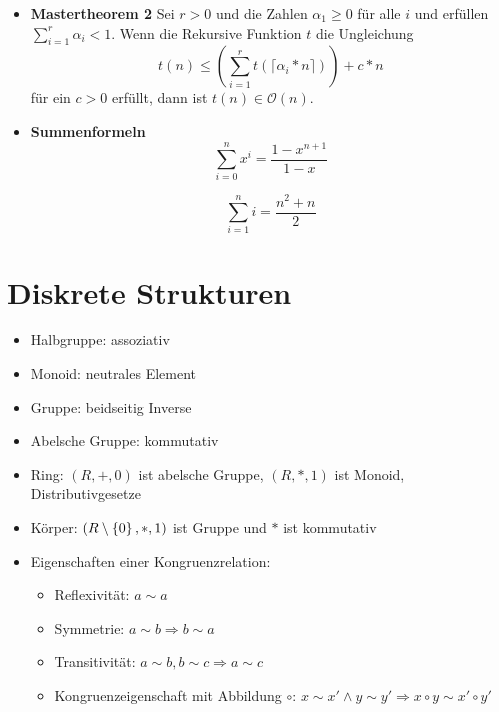\documentclass[landscape, 8pt, a4paper]{extarticle}
\newcommand{\simpleset}[1]{\ensuremath\left\{ #1 \right\}}
\renewcommand{\O}{\mathcal O}
\begin{document}
\begin{multicols}{3}
\begin{itemize}
		\item \textbf{Mastertheorem 2} Sei $r>0$ und die Zahlen $\alpha_1\geq 0$ für alle $i$ und erfüllen $\sum_{i=1}^r\alpha_i<1$.
		Wenn die Rekursive Funktion $t$ die Ungleichung
		\begin{equation*}
			t(n)\leq \left( \sum_{i=1}^r t(\lceil \alpha_i*n\rceil) \right)+c*n
		\end{equation*}
		für ein $c>0$ erfüllt, dann ist $t(n)\in\O(n)$.

		\item \textbf{Summenformeln}
		\begin{equation*}
			\sum_{i=0}^n x^i = \frac{1-x^{n+1}}{1-x}
		\end{equation*}

		\begin{equation*}
			\sum_{i=1}^n i=\frac{n^2+n}{2}
		\end{equation*}
	\end{itemize}



	\section{Diskrete Strukturen}
	\begin{itemize}
		\item Halbgruppe: assoziativ
		\item Monoid: neutrales Element
		\item Gruppe: beidseitig Inverse
		\item Abelsche Gruppe: kommutativ
		\item Ring: $(R,+,0)$ ist abelsche Gruppe, $(R,*,1)$ ist Monoid, Distributivgesetze
		\item Körper: $(R\setminus\simpleset 0, *,1)$ ist Gruppe und $*$ ist kommutativ

		
		\item Eigenschaften einer Kongruenzrelation:%
		\begin{itemize}%
			\item Reflexivität: $a\sim a$
			\item Symmetrie: $a\sim b\Rightarrow b\sim a$
			\item Transitivität: $a\sim b, b\sim c\Rightarrow a\sim c$
			\item Kongruenzeigenschaft mit Abbildung $\circ$: $x\sim x'\wedge y\sim y'\Rightarrow x\circ y\sim x'\circ y'$ 
		\end{itemize}

	\end{itemize}



\end{multicols}
\end{document}
